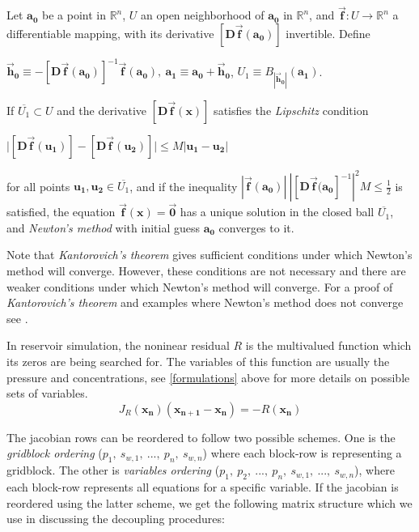 \begin{theorem}
	Let $\mathbf{a_{0}}$ be a point in $\mathbb{R}^{n}$, $U$ an open neighborhood of $\mathbf{a_{0}}$ in $\mathbb{R}^{n}$, 
	and $\mathbf{\vec{f}}: U \rightarrow \mathbb{R}^{n}$ a differentiable mapping, with its derivative $[\mathbf{D\vec{f}(a_{0})}]$
	invertible. Define\\
	\begin{center}
	$\mathbf{\vec{h}_{0}} \equiv -[\mathbf{D\vec{f}(a_{0})}]^{-1}\mathbf{\vec{f}(a_{0})}, \ \mathbf{a_{1}} \equiv \mathbf{a_{0}} + \mathbf{\vec{h}_{0}}$,  
	$ U_{1} \equiv B_{|\mathbf{\vec{h}_{0}}|}(\mathbf{a_{1}})$.\\
	\end{center}
	If $\overline{U_{1}} \subset U$ and the derivative $[\mathbf{D\vec{f}(x)}]$ satisfies the \textit{Lipschitz} condition 
	\begin{center}
	$\Big|[\mathbf{D\vec{f}(u_{1})}]-[\mathbf{D\vec{f}(u_{2})}]\Big| \leq M |\mathbf{u_{1}-u_{2}}|$
	\end{center}
	for all points $\mathbf{u_{1}, u_{2}} \in \overline{U_{1}}$, and if the inequality 
	$|\mathbf{\vec{f}(a_{0})}|\ |[\mathbf{D\vec{f}(a_{0}}]^{-1}|^{2}M \leq \frac{1}{2}$
	is satisfied, the equation $\mathbf{\vec{f}(x)} = \vec{\mathbf{0}}$ has a unique solution in the closed ball $\overline{U_{1}}$, and \textit{Newton's method} with 
	initial guess $\mathbf{a_{0}}$ converges to it.
\end{theorem}
Note that \textit{Kantorovich's theorem} gives sufficient conditions under which Newton's method will converge. However, these conditions are not necessary and there
are weaker conditions under which Newton's method will converge. For a proof of \textit{Kantorovich's theorem} and examples where Newton's method does not converge 
see \cite{hubbard}.

In reservoir simulation, the noninear residual $R$ is the multivalued function which its zeros are being searched for. The variables of this function are usually the pressure and
concentrations, see \ref{formulations} above for more details on possible sets of variables. 
\begin{equation}
J_{R}(\mathbf{x_{n}})(\mathbf{x_{n+1} - x_{n}}) = -R(\mathbf{x_{n}})
\end{equation}

The jacobian rows can be reordered to follow two possible schemes. One is the \textit{gridblock ordering} ($p_{1},\ s_{w,1},\ ...,\ p_{n},\ s_{w,n}$) where each block-row is representing a gridblock. The other is 
\textit{variables ordering} ($p_{1},\ p_{2},\ ...,\ p_{n},\ s_{w,1},\ ...,\ s_{w,n}$), where each block-row represents all equations for a specific variable. If the jacobian is reordered using the latter scheme, we 
get the following matrix structure which we use in discussing the decoupling procedures:

